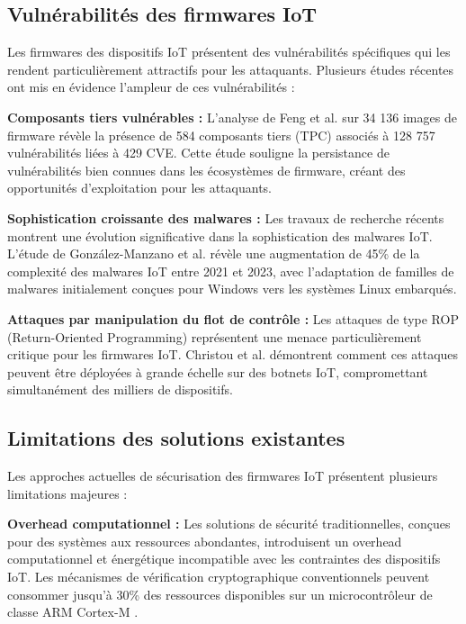 \subsection{Vulnérabilités des firmwares IoT}

Les firmwares des dispositifs \ac{IoT} présentent des vulnérabilités spécifiques qui les rendent particulièrement attractifs pour les attaquants. Plusieurs études récentes ont mis en évidence l'ampleur de ces vulnérabilités :

\textbf{Composants tiers vulnérables :} L'analyse de Feng et al. \cite{Feng2022OneBadApple} sur 34 136 images de firmware révèle la présence de 584 composants tiers (\ac{TPC}) associés à 128 757 vulnérabilités liées à 429 \ac{CVE}. Cette étude souligne la persistance de vulnérabilités bien connues dans les écosystèmes de firmware, créant des opportunités d'exploitation pour les attaquants.

\textbf{Sophistication croissante des malwares :} Les travaux de recherche récents montrent une évolution significative dans la sophistication des malwares IoT. L'étude de González-Manzano et al. \cite{Gonzalez2024ExploringShifting} révèle une augmentation de 45\% de la complexité des malwares IoT entre 2021 et 2023, avec l'adaptation de familles de malwares initialement conçues pour Windows vers les systèmes Linux embarqués.

\textbf{Attaques par manipulation du flot de contrôle :} Les attaques de type \ac{ROP} (Return-Oriented Programming) représentent une menace particulièrement critique pour les firmwares IoT. Christou et al. \cite{Christou2024DAEDALUS} démontrent comment ces attaques peuvent être déployées à grande échelle sur des botnets IoT, compromettant simultanément des milliers de dispositifs.

\subsection{Limitations des solutions existantes}

Les approches actuelles de sécurisation des firmwares IoT présentent plusieurs limitations majeures :

\textbf{Overhead computationnel :} Les solutions de sécurité traditionnelles, conçues pour des systèmes aux ressources abondantes, introduisent un overhead computationnel et énergétique incompatible avec les contraintes des dispositifs IoT. Les mécanismes de vérification cryptographique conventionnels peuvent consommer jusqu'à 30\% des ressources disponibles sur un microcontrôleur de classe ARM Cortex-M \cite{Khan2024EfficiencySecurity}.


